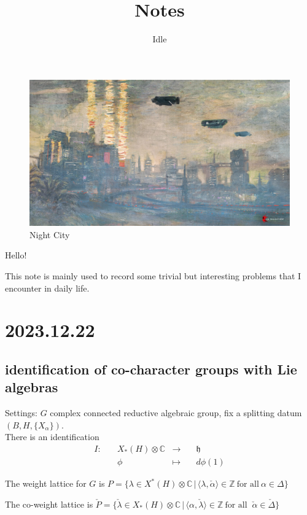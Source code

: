 \documentclass[12pt]{amsart}
\author{Idle}
\numberwithin{equation}{section}
\newcommand{\BC}{{\mathbb {C}}}
\newcommand{\BZ}{{\mathbb {Z}}}
\newcommand{\fh}{\mathfrak{h}}
\newcommand{\set}[2]{\{#1\,|\,#2\}}
\newcommand{\defmap}[5]{
           \begin{equation*}
              \begin{aligned}
                   #1:\quad  & #2 &\longrightarrow &\quad #3 \\
                      \quad  & #4    &\longmapsto  &\quad #5
              \end{aligned}
           \end{equation*}
          }
\begin{document}
\title[Notes]{Notes}
\maketitle
\begin{figure}
  \centering
  \includegraphics[width=1.0\linewidth]{Claude_Monet-NC.jpg}
  \caption{Night City}
  \label{night City}
\end{figure}

Hello!


This note is mainly used to record some trivial
but interesting problems that I encounter
in daily life.


\newpage


\tableofcontents

\newpage

\section{2023.12.22}\label{1}

\subsection{identification of co-character groups with Lie algebras}
Settings: $G$ complex connected reductive algebraic group, fix a splitting datum
$(B,H,\{X_\alpha\})$.\\


There is an identification \defmap{I}{X_*(H)\otimes \BC}{\fh}{\phi}{d\phi(1)}


The weight lattice for $G$ is $P = \set{\lambda \in X^*(H)\otimes \BC}{\langle \lambda, \check{\alpha} \rangle \in \BZ \ \textrm{for all} \ \alpha \in \Delta }$


The co-weight lattice is $\check{P} = \set{\check{\lambda} \in X_*(H)\otimes \BC}{\langle\alpha , \check{\lambda} \rangle \in \BZ \ \textrm{for all } \ \check{\alpha} \in \check{\Delta}}$
\end{document}
